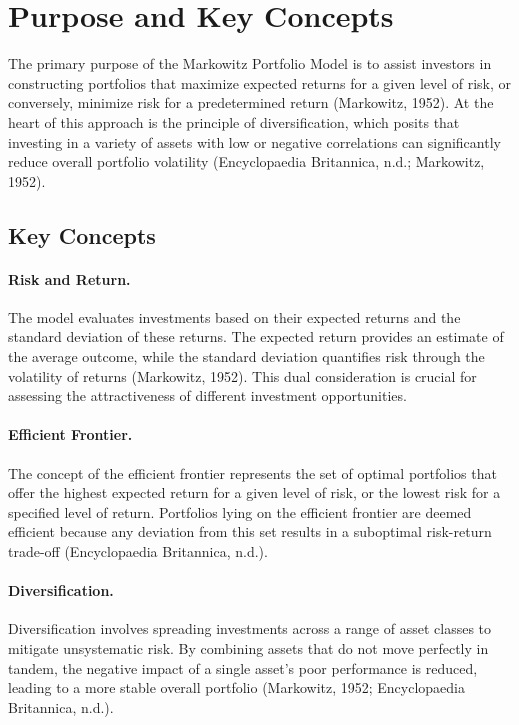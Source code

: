 \documentclass[12pt]{article}
\begin{document}
\newpage

\section{Purpose and Key Concepts}
The primary purpose of the Markowitz Portfolio Model is to assist investors in constructing portfolios that maximize expected returns for a given level of risk, or conversely, minimize risk for a predetermined return (Markowitz, 1952). At the heart of this approach is the principle of diversification, which posits that investing in a variety of assets with low or negative correlations can significantly reduce overall portfolio volatility (Encyclopaedia Britannica, n.d.; Markowitz, 1952).

\subsection*{Key Concepts}
\paragraph{Risk and Return.} The model evaluates investments based on their expected returns and the standard deviation of these returns. The expected return provides an estimate of the average outcome, while the standard deviation quantifies risk through the volatility of returns (Markowitz, 1952). This dual consideration is crucial for assessing the attractiveness of different investment opportunities.

\paragraph{Efficient Frontier.} The concept of the efficient frontier represents the set of optimal portfolios that offer the highest expected return for a given level of risk, or the lowest risk for a specified level of return. Portfolios lying on the efficient frontier are deemed efficient because any deviation from this set results in a suboptimal risk-return trade-off (Encyclopaedia Britannica, n.d.).

\paragraph{Diversification.} Diversification involves spreading investments across a range of asset classes to mitigate unsystematic risk. By combining assets that do not move perfectly in tandem, the negative impact of a single asset’s poor performance is reduced, leading to a more stable overall portfolio (Markowitz, 1952; Encyclopaedia Britannica, n.d.).
\end{document}
